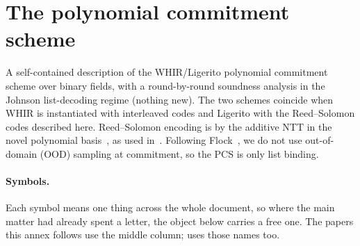 \section{The polynomial commitment scheme}\label{annex:pcs}

\begin{center}
\end{center}

A self-contained description of the WHIR\slash Ligerito polynomial commitment scheme \cite{ACFY25,NA25} over binary fields, with a round-by-round soundness analysis in the Johnson list-decoding regime (nothing new). The two schemes coincide when WHIR is instantiated with interleaved codes and Ligerito with the Reed--Solomon codes described here. Reed--Solomon encoding is by the additive NTT in the novel polynomial basis~\cite{LCH14}, as used in~\cite{DP26}. Following Flock~\cite{Flock26}, we do not use out-of-domain (OOD) sampling at commitment, so the PCS is only list binding.

\paragraph{Symbols.} Each symbol means one thing across the whole document, so where the main matter had already spent a letter, the object below carries a free one. The papers this annex follows use the middle column;  uses those names too.

